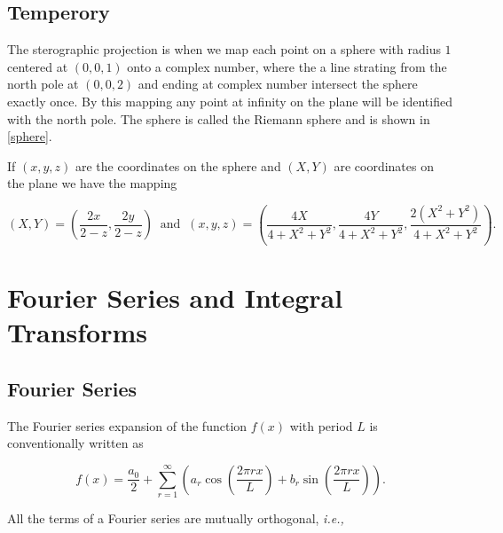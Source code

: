 \documentclass[english,a4paper,12pt]{report}
\begin{document}
\section{Temperory}

The sterographic projection is when we map each point on a sphere with radius \(1\) centered at \((0,0,1)\) onto a complex number, where the a line strating from the north pole at \((0,0,2)\) and ending at complex number intersect the sphere exactly once. By this mapping any point at infinity on the plane will be identified with the north pole. The sphere is called the Riemann sphere and is shown in \cref{sphere}.


If \((x,y,z)\) are the coordinates on the sphere and \((X,Y)\) are coordinates on the plane we have the mapping 

\begin{equation}
    (X,Y) = \left(\frac{2x}{2-z}, \frac{2y}{2-z}  \right) ~\text { and }~ (x,y,z) = \left( \frac{4X}{4+X^2+Y^2},\frac{4Y}{4+X^2+Y^2}, \frac{2(X^2+Y^2)}{4+X^2+Y^2}    \right).
\end{equation}




\chapter{Fourier Series and Integral Transforms}

\section{Fourier Series}

The Fourier series expansion of the function \(f(x)\) with period \(L\) is conventionally written as 

\begin{equation}
    f(x) = \frac{a_0 }{2} + \sum_{r=1}^{\infty} \left( a_{r} \cos \left( \frac{2\pi rx}{L}  \right) + b_{r} \sin \left( \frac{2\pi rx}{L}  \right)  \right). 
\end{equation}

All the terms of a Fourier series are mutually orthogonal, \textit{i.e.,} 
\end{document}
